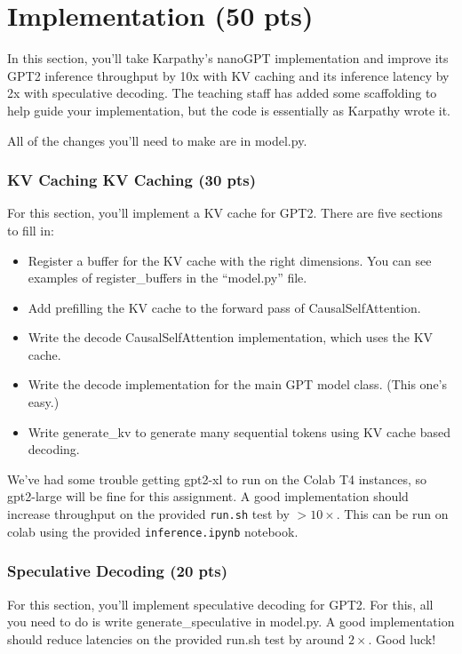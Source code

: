 \section{Implementation (50 pts)}

In this section, you'll take Karpathy's nanoGPT implementation and improve its GPT2 inference throughput by 10x with KV caching and its inference latency by 2x with speculative decoding. The teaching staff has added some scaffolding to help guide your implementation, but the code is essentially as Karpathy wrote it.

All of the changes you'll need to make are in model.py.

\subsubsection{KV Caching KV Caching (30 pts)}

For this section, you'll implement a KV cache for GPT2. There are five sections to fill in:
\begin{itemize}
    \item Register a buffer for the KV cache with the right dimensions. You can see examples of register\_buffers in the ``model.py'' file.
    \item Add prefilling the KV cache to the forward pass of CausalSelfAttention.
    \item Write the decode CausalSelfAttention implementation, which uses the KV cache.
    \item Write the decode implementation for the main GPT model class. (This one's easy.)
    \item Write generate\_kv to generate many sequential tokens using KV cache based decoding.
\end{itemize}

We've had some trouble getting gpt2-xl to run on the Colab T4 instances, so gpt2-large will be fine for this assignment. A good implementation should increase throughput on the provided \texttt{run.sh} test by $>10\times$. This can be run on colab using the provided \texttt{inference.ipynb} notebook.

\subsubsection{Speculative Decoding (20 pts)}

For this section, you'll implement speculative decoding for GPT2. For this, all you need to do is write generate\_speculative in model.py. A good implementation should reduce latencies on the provided run.sh test by around $2\times$. Good luck!


